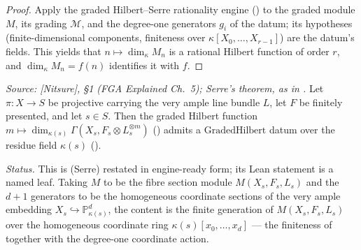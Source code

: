 \begin{proof}
  \leanok
  Apply the graded Hilbert--Serre rationality engine
  () to the graded module \(M\), its
  grading \(\mathcal{M}\), and the degree-one generators \(g_i\) of the datum;
  its hypotheses (finite-dimensional components, finiteness over
  \(\kappa[X_0,\dots,X_{r-1}]\)) are the datum's fields.  This yields that
  \(n \mapsto \dim_\kappa M_n\) is a rational Hilbert function of order \(r\), and
  \(\dim_\kappa M_n = f(n)\) identifies it with \(f\).
\end{proof}

\begin{lemma}
  \label{lem:gradedHilbert_fiber}
  \leanok
  \textit{Source: [Nitsure], \S 1 (FGA Explained Ch.~5); Serre's theorem, as in
  .}
  Let \(\pi : X \to S\) be projective carrying the very ample line bundle \(L\),
  let \(F\) be finitely presented, and let \(s \in S\).  Then the graded Hilbert
  function \(m \mapsto \dim_{\kappa(s)} \Gamma(X_s, F_s \otimes L_s^{\otimes m})\)
  () admits a \(\mathrm{GradedHilbert}\) datum over
  the residue field \(\kappa(s)\) ().

  \emph{Status.} This is  (Serre) restated in
  engine-ready form; its Lean statement is a named leaf.  Taking \(M\) to be the
  fibre section module \(M(X_s, F_s, L_s)\) and the \(d+1\) generators to be the
  homogeneous coordinate sections of the very ample embedding
  \(X_s \hookrightarrow \mathbb{P}^d_{\kappa(s)}\), the content is the finite
  generation of \(M(X_s, F_s, L_s)\) over the homogeneous coordinate ring
  \(\kappa(s)[x_0, \dots, x_d]\) --- the finiteness of
   together with the degree-one coordinate
  action.
\end{lemma}


